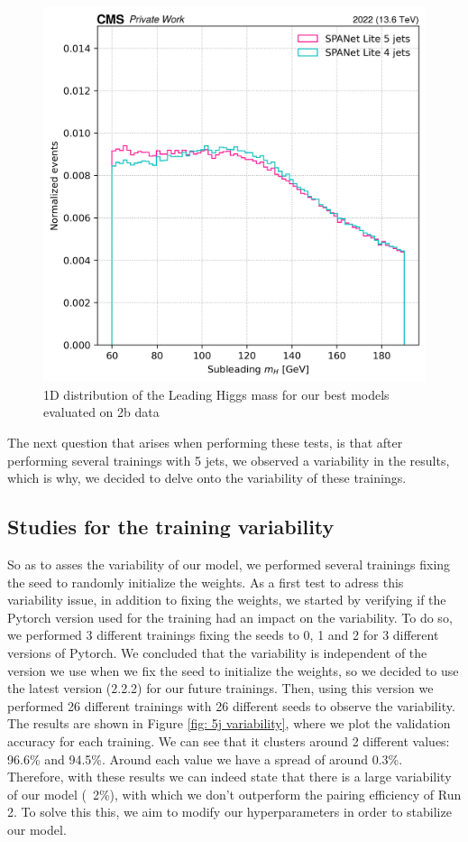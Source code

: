 \begin{figure}[hbt]
    \centering
    \includegraphics[width=0.6\linewidth]{Images/6.Improving/Mass sculpting/subleading h sculpting.png}
    \caption{1D distribution of the Leading Higgs mass for our best models evaluated on 2b data}
    \label{fig: 1D mass sculpting subleading}
\end{figure}

The next question that arises when performing these tests, is that after performing several trainings with 5 jets, we observed a variability in the results, which is why, we decided to delve onto the variability of these trainings.

\clearpage

\subsection{Studies for the training variability}
So as to asses the variability of our model, we performed several trainings fixing the seed to randomly initialize the weights. As a first test to adress this variability issue, in addition to fixing the weights, we started by verifying if the Pytorch version used for the training had an impact on the variability. To do so, we performed 3 different trainings fixing the seeds to 0, 1 and 2 for 3 different versions of Pytorch. We concluded that the variability is independent of the version we use when we fix the seed to initialize the weights, so we decided to use the latest version (2.2.2) for our future trainings. Then, using this version we performed 26 different trainings with 26 different seeds to observe the variability. The results are shown in Figure \ref{fig: 5j variability}, where we plot the validation accuracy for each training. We can see that it clusters around 2 different values: 96.6\% and 94.5\%. Around each value we have a spread of around 0.3\%. Therefore, with these results we can indeed state that there is a large variability of our model (~2\%), with which we don't outperform the pairing efficiency of Run 2. To solve this this, we aim to modify our hyperparameters in order to stabilize our model.

